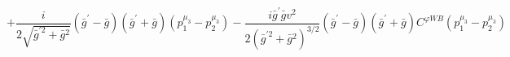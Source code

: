 %
\begin{dmath*}
%
  +  \frac{i}{2 \sqrt{{\bar g}^{\prime 2} + {\bar g}{}^2}}({\bar g}^\prime - {\bar g}{}) ({\bar g}^\prime + {\bar g}{}) \left(p_1^{\mu_3} - p_2^{\mu_3}\right)  -  \frac{i {\bar g}^\prime {\bar g}{} v^2}{2 \left({\bar g}^{\prime 2} + {\bar g}{}^2\right)^{3/2}}({\bar g}^\prime - {\bar g}{}) ({\bar g}^\prime + {\bar g}{}) C^{ \varphi  WB} \left(p_1^{\mu_3} - p_2^{\mu_3}\right)
%
\end{dmath*}
%
